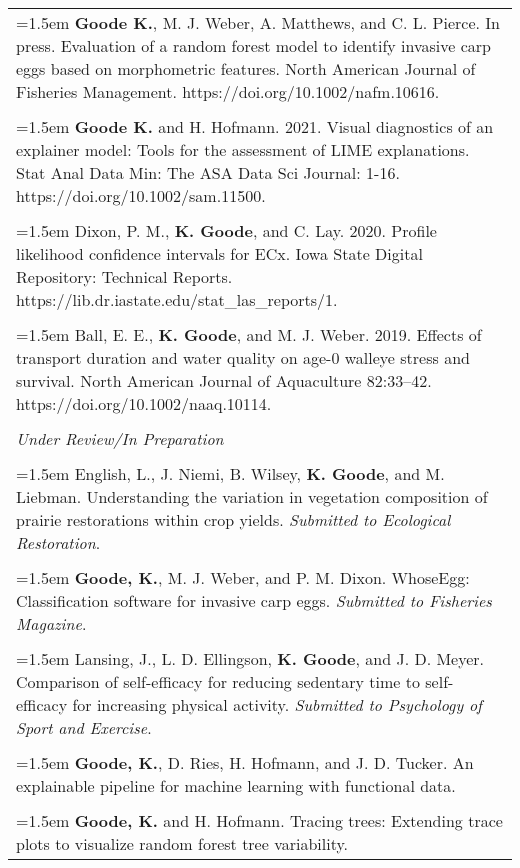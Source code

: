 \documentclass[10pt, oneside]{article}
\begin{document}
\begin{longtable}{p{16.5cm}}
\hangindent=1.5em \textbf{Goode K.}, M. J. Weber, A. Matthews, and C. L. Pierce. In press. Evaluation of a random forest model to identify invasive carp eggs based on morphometric features. North American Journal of Fisheries Management. https://doi.org/10.1002/nafm.10616.\\
\\
\hangindent=1.5em \textbf{Goode K.} and H. Hofmann. 2021. Visual diagnostics of an explainer model: Tools for the assessment of LIME explanations. Stat Anal Data Min: The ASA Data Sci Journal: 1-16. https://doi.org/10.1002/sam.11500.\\
\\
\hangindent=1.5em Dixon, P. M., \textbf{K. Goode}, and C. Lay. 2020. Profile likelihood confidence intervals for ECx. Iowa State Digital Repository: Technical Reports. https://lib.dr.iastate.edu/stat\_las\_reports/1.\\
\\
\hangindent=1.5em Ball, E. E., \textbf{K. Goode}, and M. J. Weber. 2019. Effects of transport duration and water quality on age-0 walleye stress and survival. North American Journal of Aquaculture 82:33–42. https://doi.org/10.1002/naaq.10114.\\
\\
\emph{Under Review/In Preparation}\\
\\
\hangindent=1.5em English, L., J. Niemi, B. Wilsey, \textbf{K. Goode}, and M. Liebman. Understanding the variation in vegetation composition of prairie restorations within crop yields. \emph{Submitted to Ecological Restoration}.\\
\\
\hangindent=1.5em \textbf{Goode, K.}, M. J. Weber, and P. M. Dixon. WhoseEgg: Classification software for invasive carp eggs. \emph{Submitted to Fisheries Magazine}.\\
\\
\hangindent=1.5em Lansing, J., L. D. Ellingson, \textbf{K. Goode}, and J. D. Meyer. Comparison of self-efficacy for reducing sedentary time to self-efficacy for increasing physical activity. \emph{Submitted to Psychology of Sport and Exercise}.\\
\\
\hangindent=1.5em \textbf{Goode, K.}, D. Ries, H. Hofmann, and J. D. Tucker. An explainable pipeline for machine learning with functional data.\\
\\
\hangindent=1.5em \textbf{Goode, K.} and H. Hofmann. Tracing trees: Extending trace plots to visualize random forest tree variability.
\end{longtable}
\end{document}

